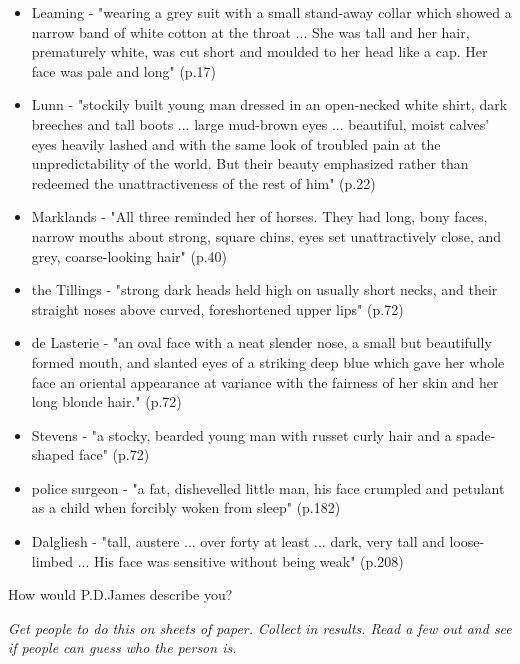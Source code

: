 \documentclass[11pt]{article}
\begin{document}
\begin{itemize}
\item  Leaming - "wearing a grey suit with a small stand-away collar which showed a narrow band of white cotton at the throat ... She was tall and her hair, prematurely white, was cut short and moulded to her head like a cap. Her face was pale and long" (p.17)
\item  Lunn - "stockily built young man dressed in an open-necked white shirt, dark breeches and tall boots ... large mud-brown eyes ... beautiful, moist calves' eyes heavily lashed and with the same look of troubled pain at the unpredictability of the world. But their beauty emphasized rather than redeemed the unattractiveness of the rest of him" (p.22)
\item  Marklands - "All three reminded her of horses. They had long, bony faces, narrow mouths about strong, square chins, eyes set unattractively close, and grey, coarse-looking hair" (p.40)
\item  the Tillings - "strong dark heads held high on usually short necks, and their straight noses above curved, foreshortened upper lips" (p.72)
\item  de Lasterie - "an oval face with a neat slender nose, a small but beautifully formed mouth, and slanted eyes of a striking deep blue which gave her whole face an oriental appearance at variance with the fairness of her skin and her long blonde hair." (p.72)
\item  Stevens - "a stocky, bearded young man with russet curly hair and a spade-shaped face" (p.72)
\item  police surgeon - "a fat, dishevelled little man, his face crumpled and petulant as a child when forcibly woken from sleep" (p.182)
\item  Dalgliesh - "tall, austere ... over forty at least ... dark, very tall and loose-limbed ... His face was sensitive without being weak" (p.208)
\end{itemize}

How would P.D.James describe you?



\textit{Get people to do this on sheets of paper. Collect in results. Read a few
    out and see if people can guess who the person is.}
\end{document}

